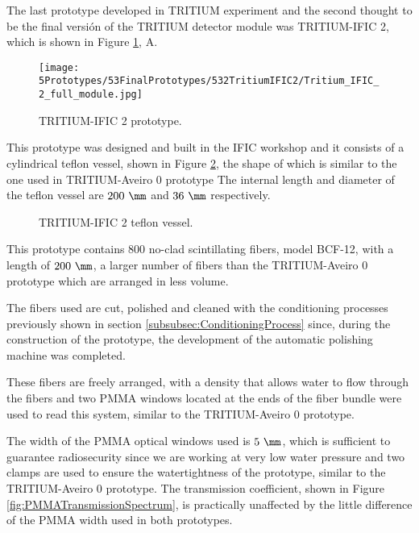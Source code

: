 The last prototype developed in TRITIUM experiment and the second thought to be the final versión of the TRITIUM detector module was TRITIUM-IFIC 2, which is shown in Figure \ref{fig:TritiumIFIC2}, A.

\begin{figure}[h]
\centering
\texttt{[image: 5Prototypes/53FinalPrototypes/532TritiumIFIC2/Tritium\_IFIC\_2\_full\_module.jpg]}
\caption{TRITIUM-IFIC 2 prototype.\label{fig:TritiumIFIC2}}
\end{figure}

This prototype was designed and built in the IFIC workshop and it consists of a cylindrical teflon vessel, shown in Figure \ref{fig:Tritium-IFIC2_vessels}, the shape of which is similar to the one used in TRITIUM-Aveiro 0 prototype The internal length and diameter of the teflon vessel are $200~\mm$ and $36~\mm$ respectively.

\begin{figure}[h]
 \centering
 \caption{TRITIUM-IFIC 2 teflon vessel.}
 \label{fig:Tritium-IFIC2_vessels}
\end{figure}

This prototype contains $800$ no-clad scintillating fibers, model BCF-12, with a length of $200~\mm$, a larger number of fibers than the TRITIUM-Aveiro 0 prototype which are arranged in less volume.

The fibers used are cut, polished and cleaned with the conditioning processes previously shown in section \ref{subsubsec:ConditioningProcess} since, during the construction of the prototype, the development of the automatic polishing machine was completed.

These fibers are freely arranged, with a density that allows water to flow through the fibers and two PMMA windows located at the ends of the fiber bundle were used to read this system, similar to the TRITIUM-Aveiro 0 prototype. 

The width of the PMMA optical windows used is $5~\mm$, which is sufficient to guarantee radiosecurity since we are working at very low water pressure  and two clamps are used to ensure the watertightness of the prototype, similar to the TRITIUM-Aveiro 0 prototype. The transmission coefficient, shown in Figure \ref{fig:PMMATransmissionSpectrum}, is practically unaffected by the little difference of the PMMA width used in both prototypes.


